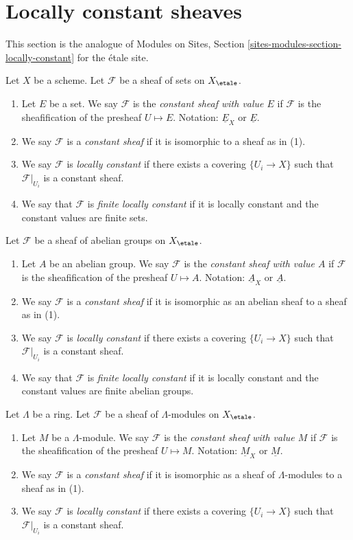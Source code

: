 \section{Locally constant sheaves}
\label{section-locally-constant}

\noindent
This section is the analogue of
Modules on Sites, Section \ref{sites-modules-section-locally-constant}
for the \'etale site.

\begin{definition}
\label{definition-finite-locally-constant}
Let $X$ be a scheme.
Let $\mathcal{F}$ be a sheaf of sets on $X_\etale$.
\begin{enumerate}
\item Let $E$ be a set. We say $\mathcal{F}$ is the
{\it constant sheaf with value $E$} if $\mathcal{F}$ is the
sheafification of the presheaf $U \mapsto E$.
Notation: $\underline{E}_X$ or $\underline{E}$.
\item We say $\mathcal{F}$ is a {\it constant sheaf} if it is
isomorphic to a sheaf as in (1).
\item We say $\mathcal{F}$ is {\it locally constant} if there exists a
covering $\{U_i \to X\}$ such that $\mathcal{F}|_{U_i}$ is a constant sheaf.
\item We say that $\mathcal{F}$ is {\it finite locally constant} if it
is locally constant and the constant values are finite sets.
\end{enumerate}
Let $\mathcal{F}$ be a sheaf of abelian groups on $X_\etale$.
\begin{enumerate}
\item Let $A$ be an abelian group.
We say $\mathcal{F}$ is the {\it constant sheaf with value $A$} if
$\mathcal{F}$ is the sheafification of the presheaf $U \mapsto A$.
Notation: $\underline{A}_X$ or $\underline{A}$.
\item We say $\mathcal{F}$ is a {\it constant sheaf} if it is isomorphic
as an abelian sheaf to a sheaf as in (1).
\item We say $\mathcal{F}$ is {\it locally constant} if there exists a
covering $\{U_i \to X\}$ such that $\mathcal{F}|_{U_i}$ is a constant sheaf.
\item We say that $\mathcal{F}$ is {\it finite locally constant} if it
is locally constant and the constant values are finite abelian groups.
\end{enumerate}
Let $\Lambda$ be a ring. Let $\mathcal{F}$ be a sheaf of $\Lambda$-modules
on $X_\etale$.
\begin{enumerate}
\item Let $M$ be a $\Lambda$-module.
We say $\mathcal{F}$ is the {\it constant sheaf with value $M$} if
$\mathcal{F}$ is the sheafification of the presheaf $U \mapsto M$.
Notation: $\underline{M}_X$ or $\underline{M}$.
\item We say $\mathcal{F}$ is a {\it constant sheaf} if it is isomorphic
as a sheaf of $\Lambda$-modules to a sheaf as in (1).
\item We say $\mathcal{F}$ is {\it locally constant} if there exists a
covering $\{U_i \to X\}$ such that $\mathcal{F}|_{U_i}$ is a constant sheaf.
\end{enumerate}
\end{definition}

